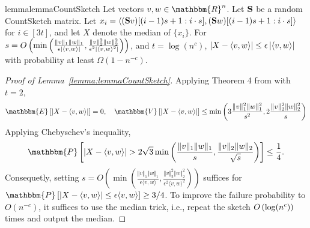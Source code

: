 \begin{restatable}{lemma}{lemmaCountSketch}\label{lemma:lemmaCountSketch} \label{lemma:8} Let vectors $v, w \in \mathbbm{R}^n$. Let $\mathbf{S}$ be a random CountSketch matrix. Let $x_i = \langle (\mathbf{S} v)[(i-1)s+1:i\cdot s], (\mathbf{S} w)[(i-1)s+1:i\cdot s]\rangle$ for $i \in [3t]$, and let $X$ denote the median of $\{x_i\}$. For $s = O\left( \min\left( \frac{\Vert v \Vert_1 \Vert w \Vert_1}{\epsilon \left| \langle v, w \rangle \right|}, \frac{\Vert v \Vert_2^2 \Vert w \Vert_2^2}{\epsilon^2 \left| \langle v, w \rangle^2 \right|} \right)\right)$, and $t = \log(n^{c})$, $\left| X - \langle v, w \rangle \right| \leq \epsilon \left| \langle v, w \rangle \right|$ with probability at least $\Omega(1-n^{-c})$.
\end{restatable}
\begin{proof}[Proof of Lemma~\ref{lemma:lemmaCountSketch}] Applying Theorem 4 from \cite{LPT2012} with $t = 2$,
\begin{align*}
    \mathbbm{E}\left[\left\lvert X-\left\langle v, w \right\rangle \right\rvert\right] = 0, \quad 
    \mathbbm{V}\left[\left\lvert X-\left\langle v, w \right\rangle \right\rvert\right] \leq \min\left(3 \frac{\Vert v \Vert_1^2 \Vert w \Vert_1^2}{s^2}, 2\frac{\Vert v \Vert_2^2 \Vert w \Vert_2^2}{s}\right)
\end{align*}
Applying Chebyschev's inequality, 
\begin{align*}
    \mathbbm{P}\left[\left\lvert X-\langle v, w \rangle \right\rvert > 2\sqrt{3} \min\left(\frac{\Vert v \Vert_1 \Vert w \Vert_1}{s}, \frac{\Vert v \Vert_2 \Vert w \Vert_2}{\sqrt{s}}\right)\right] \leq \frac{1}{4}. 
\end{align*}
Consequetly, setting $s = O\left( \min\left(\frac{\Vert v \Vert_1 \Vert w \Vert_1}{\epsilon \langle v, w \rangle}, \frac{\Vert v \Vert_2^2 \Vert w \Vert_2^2}{\epsilon^2 \langle v, w \rangle^2}\right)\right)$ suffices for \\ $\mathbbm{P}\left[\abs{X -\langle v, w\rangle} \leq \epsilon \langle v, w \rangle \right] \geq 3/4$. To improve the failure probability to $O(n^{-c})$, it suffices to use the median trick, i.e., repeat the sketch $O\left( \log(n^c) \right)$ times and output the median. 
\end{proof}

